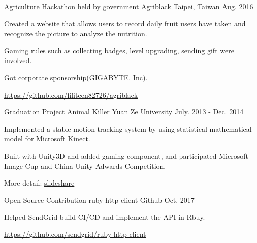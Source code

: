 \begin{cventries}
  \cventry
    {Agriculture Hackathon held by government}
    {Agriblack}
    {Taipei, Taiwan}
    {Aug. 2016}
    {
      \begin{cvitems}
        \item {Created a website that allows users to record daily fruit users have taken and recognize the picture to analyze the nutrition.}
        \item {Gaming rules such as collecting badges, level upgrading, sending gift were involved.}
        \item{Got corporate sponsorship(GIGABYTE. Inc).}
        \item {{\color{red}\href{https://github.com/fifiteen82726/agriblack}{https://github.com/fifiteen82726/agriblack}}}
      \end{cvitems}
    }
  \cventry
  {Graduation Project}
    {Animal Killer}
    {Yuan Ze University}
    {July. 2013 - Dec. 2014}
    {
      \begin{cvitems}
        \item {Implemented a stable motion tracking system by using statistical mathematical model for Microsoft Kinect.}
        \item {Built with Unity3D and added gaming component, and participated Microsoft Image Cup and China Unity Adwards Competition.}
        \item{More detail: {\color{red}\href{https://www.slideshare.net/CodaChang1/animal-killer-82988561}{slideshare}}}
      \end{cvitems}
    }
  \cventry
  {Open Source Contribution}
    {ruby-http-client}
    {Github}
    {Oct. 2017}
    {
      \begin{cvitems}
        \item {Helped SendGrid build CI/CD and implement the API in Rbuy.}
        \item{{\color{red}\href{https://github.com/sendgrid/ruby-http-client}{https://github.com/sendgrid/ruby-http-client}}}
      \end{cvitems}
    }
\end{cventries}
\vspace{-\baselineskip}